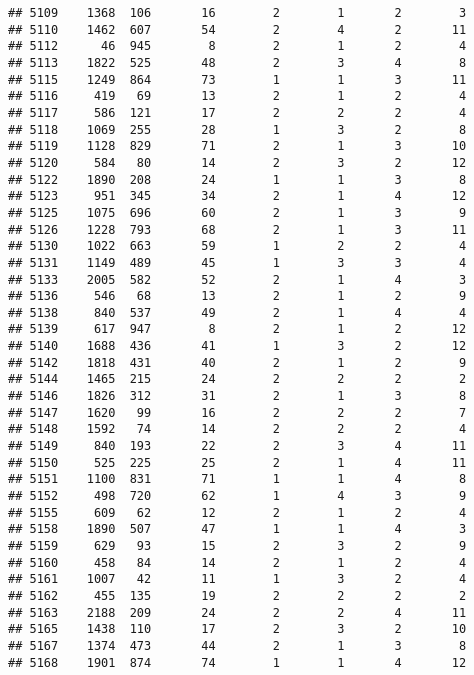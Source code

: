 \documentclass[]{article}
\begin{document}
\begin{verbatim}
## 5109    1368  106       16        2        1       2        3
## 5110    1462  607       54        2        4       2       11
## 5112      46  945        8        2        1       2        4
## 5113    1822  525       48        2        3       4        8
## 5115    1249  864       73        1        1       3       11
## 5116     419   69       13        2        1       2        4
## 5117     586  121       17        2        2       2        4
## 5118    1069  255       28        1        3       2        8
## 5119    1128  829       71        2        1       3       10
## 5120     584   80       14        2        3       2       12
## 5122    1890  208       24        1        1       3        8
## 5123     951  345       34        2        1       4       12
## 5125    1075  696       60        2        1       3        9
## 5126    1228  793       68        2        1       3       11
## 5130    1022  663       59        1        2       2        4
## 5131    1149  489       45        1        3       3        4
## 5133    2005  582       52        2        1       4        3
## 5136     546   68       13        2        1       2        9
## 5138     840  537       49        2        1       4        4
## 5139     617  947        8        2        1       2       12
## 5140    1688  436       41        1        3       2       12
## 5142    1818  431       40        2        1       2        9
## 5144    1465  215       24        2        2       2        2
## 5146    1826  312       31        2        1       3        8
## 5147    1620   99       16        2        2       2        7
## 5148    1592   74       14        2        2       2        4
## 5149     840  193       22        2        3       4       11
## 5150     525  225       25        2        1       4       11
## 5151    1100  831       71        1        1       4        8
## 5152     498  720       62        1        4       3        9
## 5155     609   62       12        2        1       2        4
## 5158    1890  507       47        1        1       4        3
## 5159     629   93       15        2        3       2        9
## 5160     458   84       14        2        1       2        4
## 5161    1007   42       11        1        3       2        4
## 5162     455  135       19        2        2       2        2
## 5163    2188  209       24        2        2       4       11
## 5165    1438  110       17        2        3       2       10
## 5167    1374  473       44        2        1       3        8
## 5168    1901  874       74        1        1       4       12

\end{verbatim}
\end{document}

